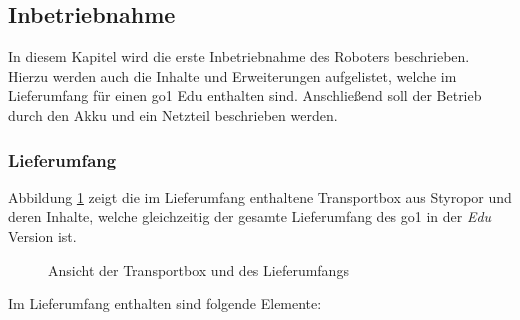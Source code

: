 \subsection{Inbetriebnahme}
\label{subsec:inbetriebnahme}

In diesem Kapitel wird die erste Inbetriebnahme des Roboters beschrieben.
Hierzu werden auch die Inhalte und Erweiterungen aufgelistet, welche im Lieferumfang für einen \gls{go1} Edu enthalten sind.
Anschließend soll der Betrieb durch den Akku und ein Netzteil beschrieben werden.


\subsubsection{Lieferumfang}

Abbildung \ref{fig:lieferumfang} zeigt die im Lieferumfang enthaltene Transportbox aus Styropor und deren Inhalte, welche
gleichzeitig der gesamte Lieferumfang des \gls{go1} in der \emph{Edu} Version ist.

\begin{figure}[h]
    \caption{Ansicht der Transportbox und des Lieferumfangs}\label{fig:lieferumfang}
\end{figure}

\noindent Im Lieferumfang enthalten sind folgende Elemente:

